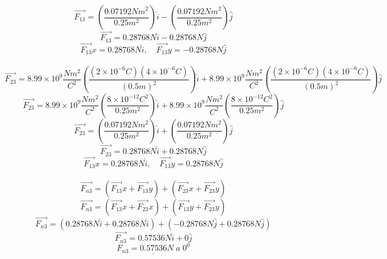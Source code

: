 \documentclass[12pt]{article}
\begin{document}
			$$ \vec{F_{13}} = \left( \frac{0.07192Nm^2}{0.25m^2} \right) \hat{i} - \left( \frac{0.07192Nm^2}{0.25m^2} \right) \hat{j} $$
			$$ \vec{F_{13}} = 0.28768N \hat{i} - 0.28768N \hat{j} $$ 
			$$ \vec{F_{13}}x = 0.28768N \hat{i}, \quad \vec{F_{13}}y = -0.28768N \hat{j} $$\\
			$$ \vec{F_{23}} = 8.99 \times 10^9 \frac{Nm^2}{C^2} \left( \frac{(2 \times 10^{-6}C)(4 \times 10^{-6}C)}{(0.5m)^2} \right) \hat{i}
			+ 8.99 \times 10^9 \frac{Nm^2}{C^2} \left( \frac{(2 \times 10^{-6}C)(4 \times 10^{-6}C)}{(0.5m)^2} \right) \hat{j}  $$
			$$ \vec{F_{23}} = 8.99 \times 10^9 \frac{Nm^2}{C^2} \left( \frac{8 \times 10^{-12}C^2}{0.25m^2} \right) \hat{i}
			+ 8.99 \times 10^9 \frac{Nm^2}{C^2} \left( \frac{8 \times 10^{-12}C^2}{0.25m^2} \right) \hat{j} $$
			$$ \vec{F_{23}} = \left( \frac{0.07192Nm^2}{0.25m^2} \right) \hat{i} + \left( \frac{0.07192Nm^2}{0.25m^2} \right) \hat{j} $$
			$$ \vec{F_{23}} = 0.28768N \hat{i} + 0.28768N \hat{j} $$
			$$ \vec{F_{13}}x = 0.28768N \hat{i}, \quad \vec{F_{13}}y = 0.28768N \hat{j} $$\\
			$$ \vec{F_{n3}} = (\vec{F_{13}}x + \vec{F_{13}}y) + (\vec{F_{23}}x + \vec{F_{23}}y) $$
			$$ \vec{F_{n3}} = (\vec{F_{13}}x + \vec{F_{23}}x) + (\vec{F_{13}}y + \vec{F_{23}}y) $$
			$$ \vec{F_{n3}} = (0.28768N \hat{i} + 0.28768N \hat{i}) + (-0.28768N \hat{j} + 0.28768N \hat{j}) $$
			$$ \vec{F_{n3}} = 0.57536N \hat{i} + 0 \hat{j} $$
			$$ \underline{F_{n3} = 0.57536N \; a \; 0^0} $$
\end{document}
